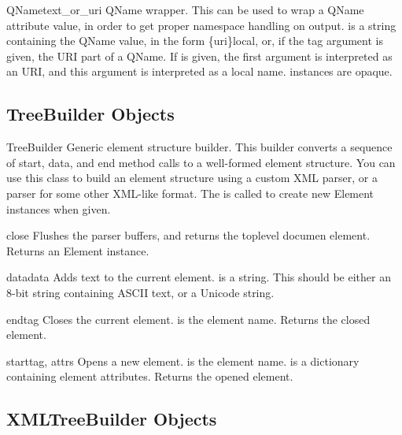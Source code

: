 \begin{classdesc}{QName}{text_or_uri}
QName wrapper.  This can be used to wrap a QName attribute value, in
order to get proper namespace handling on output.
 is a string containing the QName value,
in the form {\{}uri{\}}local, or, if the tag argument is given,
the URI part of a QName.
If  is given, the first argument is interpreted as
an URI, and this argument is interpreted as a local name.
 instances are opaque.
\end{classdesc}


\subsection{TreeBuilder Objects\label{elementtree-treebuilder-objects}}

\begin{classdesc}{TreeBuilder}{}
Generic element structure builder.  This builder converts a sequence
of start, data, and end method calls to a well-formed element structure.
You can use this class to build an element structure using a custom XML
parser, or a parser for some other XML-like format.
The  is called to create new Element instances when
given.
\end{classdesc}

\begin{methoddesc}{close}{}
Flushes the parser buffers, and returns the toplevel documen
element.
Returns an Element instance.
\end{methoddesc}

\begin{methoddesc}{data}{data}
Adds text to the current element.
 is a string.  This should be either an 8-bit string
containing ASCII text, or a Unicode string.
\end{methoddesc}

\begin{methoddesc}{end}{tag}
Closes the current element.
 is the element name.
Returns the closed element.
\end{methoddesc}

\begin{methoddesc}{start}{tag, attrs}
Opens a new element.
 is the element name.
 is a dictionary containing element attributes.
Returns the opened element.
\end{methoddesc}


\subsection{XMLTreeBuilder Objects\label{elementtree-xmltreebuilder-objects}}


